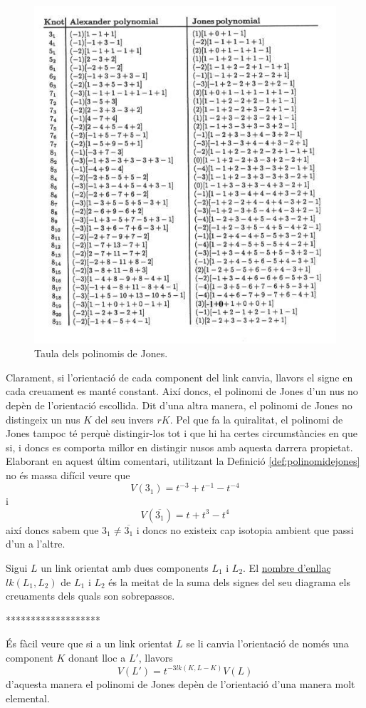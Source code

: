 \begin{figure}
	\centering
	\includegraphics[width=0.9\linewidth]{img/jonespolynomials.jpg}
	\caption{Taula dels polinomis de Jones.}\label{fig:polinomidejones}
\end{figure}

Clarament, si l'orientació de cada component del link canvia, llavors el signe en cada creuament es manté constant. Així doncs, el polinomi de Jones d'un nus no depèn de l'orientació escollida. Dit d'una altra manera, el polinomi de Jones no distingeix un nus $K$ del seu invers $rK$. Pel que fa la quiralitat, el polinomi de Jones tampoc té perquè distingir-los tot i que hi ha certes circumstàncies en que si, i doncs es comporta millor en distingir nusos amb aquesta darrera propietat. Elaborant en aquest últim comentari, utilitzant la Definició \ref{def:polinomidejones} no és massa difícil veure que $$V(3_1)=t^{-3}+t^{-1}-t^{-4}$$ i $$V(\overline{3_1})=t+t^3-t^4$$ així doncs sabem que $3_1\neq\overline{3_1}$ i doncs no existeix cap isotopia ambient que passi d'un a l'altre.\\

\begin{definition}\label{def:nombredenllaç}
	Sigui $L$ un link orientat amb dues components $L_1$ i $L_2$. El \underline{nombre d'enllaç} $lk(L_1,L_2)$ de $L_1$ i $L_2$ és la meitat de la suma dels signes del seu diagrama els creuaments dels quals son sobrepassos.
\end{definition}
*******************

És fàcil veure que si a un link orientat $L$ se li canvia l'orientació de només una component $K$ donant lloc a $L'$, llavors $$V(L')=t^{-3lk(K,L-K)}V(L)$$ d'aquesta manera el polinomi de Jones depèn de l'orientació d'una manera molt elemental.